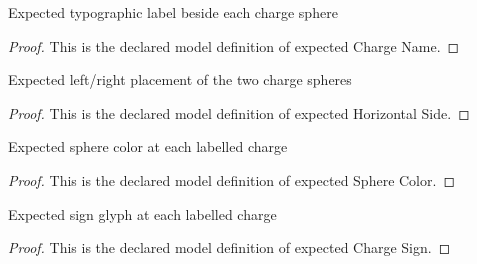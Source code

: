 \begin{definition}
  \label{def:physics:phyx-mini-0992:phyxminiproblems-problemphyxmini0992-expectedchargename}
  Expected typographic label beside each charge sphere
\end{definition}
\begin{proof}
  This is the declared model definition of expected Charge Name.
\end{proof}
\begin{definition}
  \label{def:physics:phyx-mini-0992:phyxminiproblems-problemphyxmini0992-expectedhorizontalside}
  Expected left/right placement of the two charge spheres
\end{definition}
\begin{proof}
  This is the declared model definition of expected Horizontal Side.
\end{proof}
\begin{definition}
  \label{def:physics:phyx-mini-0992:phyxminiproblems-problemphyxmini0992-expectedspherecolor}
  Expected sphere color at each labelled charge
\end{definition}
\begin{proof}
  This is the declared model definition of expected Sphere Color.
\end{proof}
\begin{definition}
  \label{def:physics:phyx-mini-0992:phyxminiproblems-problemphyxmini0992-expectedchargesign}
  Expected sign glyph at each labelled charge
\end{definition}
\begin{proof}
  This is the declared model definition of expected Charge Sign.
\end{proof}

